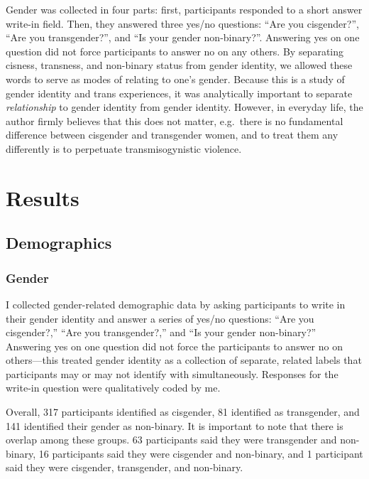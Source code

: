 \documentclass[12pt,twoside]{reedthesis}
\begin{document}
Gender was collected in four parts: first, participants responded to a short answer write-in field. Then, they answered three yes/no questions: ``Are you cisgender?'', ``Are you transgender?'', and ``Is your gender non-binary?''. Answering yes on one question did not force participants to answer no on any others. By separating cisness, transness, and non-binary status from gender identity, we allowed these words to serve as modes of relating to one's gender. Because this is a study of gender identity and trans experiences, it was analytically important to separate \emph{relationship} to gender identity from gender identity. However, in everyday life, the author firmly believes that this does not matter, e.g.~there is no fundamental difference between cisgender and transgender women, and to treat them any differently is to perpetuate transmisogynistic violence.

\hypertarget{results}{%
\chapter{Results}\label{results}}

\hypertarget{demographics}{%
\section{Demographics}\label{demographics}}

\hypertarget{gender}{%
\subsection{Gender}\label{gender}}

I collected gender-related demographic data by asking participants to write in their gender identity and answer a series of yes/no questions: ``Are you cisgender?,'' ``Are you transgender?,'' and ``Is your gender non-binary?'' Answering yes on one question did not force the participants to answer no on others---this treated gender identity as a collection of separate, related labels that participants may or may not identify with simultaneously. Responses for the write-in question were qualitatively coded by me.

Overall, 317 participants identified as cisgender, 81 identified as transgender, and 141 identified their gender as non-binary. It is important to note that there is overlap among these groups. 63 participants said they were transgender and non-binary, 16 participants said they were cisgender and non-binary, and 1 participant said they were cisgender, transgender, and non-binary.
\end{document}
